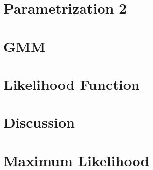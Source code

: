 \documentclass[9pt,twocolumn,twoside,]{pnas-new}
\begin{document}
\hypertarget{parametrization-2}{%
\section{Parametrization 2}\label{parametrization-2}}

\hypertarget{gmm}{%
\section{GMM}\label{gmm}}

\hypertarget{likelihood-function}{%
\section{Likelihood Function}\label{likelihood-function}}

\hypertarget{discussion}{%
\section{Discussion}\label{discussion}}

\hypertarget{maximum-likelihood}{%
\section{Maximum Likelihood}\label{maximum-likelihood}}

\showmatmethods
\showacknow
\pnasbreak



% 
\end{document}
